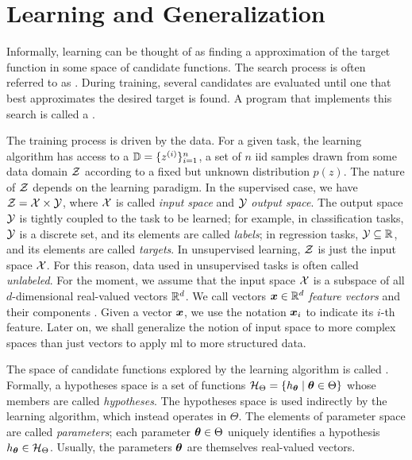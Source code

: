 \section{Learning and Generalization}\label{sec:learning}
Informally, learning can be thought of as finding a  approximation of the target function in some space of candidate functions. The search process is often referred to as . During training, several candidates are evaluated until one that best approximates the desired target is found. A program that implements this search is called a .

The training process is driven by the data. For a given task, the learning algorithm has access to a  $\mathbb{D} = \{z^{(i)}\}_{i=1}^n$, a set of $n$ \gls{iid} samples drawn from some data domain $\Cal{Z}$ according to a fixed but unknown distribution $p(z)$. The nature of $\Cal{Z}$ depends on the learning paradigm. In the supervised case, we have $\Cal{Z} = \Cal{X} \times \Cal{Y}$, where $\Cal{X}$ is called \emph{input space} and $\Cal{Y}$ \emph{output space}. The output space $\Cal{Y}$ is tightly coupled to the task to be learned; for example, in classification tasks, $\Cal{Y}$ is a discrete set, and its elements are called \emph{labels}; in regression tasks, $\Cal{Y} \subseteq \Real$, and its elements are called \emph{targets}. In unsupervised learning, $\Cal{Z}$ is just the input space $\Cal{X}$. For this reason, data used in unsupervised tasks is often called \emph{unlabeled}. For the moment, we assume that the input space $\Cal{X}$ is a subspace of all $d$-dimensional real-valued vectors $\mathbb{R}^d$. We call vectors $\Vector{x} \in \Real^d$  \emph{feature vectors} and their components . Given a vector $\Vector{x}$, we use the notation $\Feature{x}{i}$ to indicate its $i$-th feature. Later on, we shall generalize the notion of input space to more complex spaces than just vectors to apply \gls{ml} to more structured data.

The space of candidate functions explored by the learning algorithm is called . Formally, a hypotheses space is a set of functions $\HSpace = \Set{h_{\Param} \mid \Param \in \Theta}$ whose members are called \emph{hypotheses}. The hypotheses space is used indirectly by the learning algorithm, which instead operates in  $\Theta$. The elements of parameter space are called \emph{parameters}; each parameter $\boldsymbol{\theta} \in \Theta$ uniquely identifies a hypothesis $h_{\Param} \in \HSpace$. Usually, the parameters $\boldsymbol{\theta}$ are themselves real-valued vectors.

